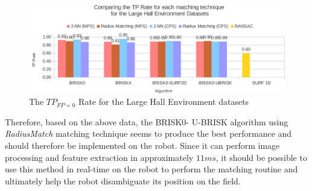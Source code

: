 \documentclass{report}
\begin{document}
\begin{figure}
  \centering
    \includegraphics[width=1.0\textwidth]{../Drawings/Graphs/tp_rate_lh.pdf}
    \caption{The $TP_{FP=0}$ Rate for the Large Hall Environment datasets} 
    \label{fig:tp_rate_lh}
\end{figure}
%



Therefore, based on the above data, the BRISK0- U-BRISK algorithm using \textit{RadiusMatch} matching technique seems to produce the best performance and should therefore be implemented on the robot. Since it can perform image processing and feature extraction in approximately $11 ms$, it should be possible to use this method in real-time on the robot to perform the matching routine and ultimately help the robot disambiguate its position on the field.\\
\end{document}
